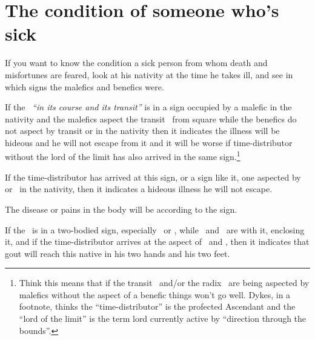 \section{The condition of someone who's sick}
If you want to know the condition a sick person from whom death and misfortunes are feared, look at his nativity at the time he takes ill, and see in which signs the malefics and benefics were. 

If the \Moon\, \textsl{``in its course and its transit''} is in a sign occupied by a malefic in the nativity and the malefics aspect the transit \Moon\,  from square while the benefics do not aspect by transit or in the nativity then it indicates the illness will be hideous and he will not escape from it and it will be worse if time-distributor without the lord of the limit has also arrived in the same sign.\footnote{Think this means that if the transit \Moon\, and/or the radix \Moon\, are being aspected by malefics without the aspect of a benefic things won't go well. Dykes, in a footnote, thinks the ``time-distributor'' is the profected Ascendant and the ``lord of the limit'' is the term lord currently active by ``direction through the bounds''.}

If the time-distributor has arrived at this sign, or a sign like it, one aspected by \Saturn\, or \Mars\, in the nativity, then it indicates a hideous illness he will not escape.

The disease or pains in the body will be according to the sign.

If the \Moon\, is in a two-bodied sign, especially \Gemini\, or \Pisces, while \Saturn\, and \Mars\, are with it, enclosing it, and if the time-distributor arrives at the aspect of \Saturn\, and \Mars, then it indicates that gout will reach this native in his two hands and his two feet.
